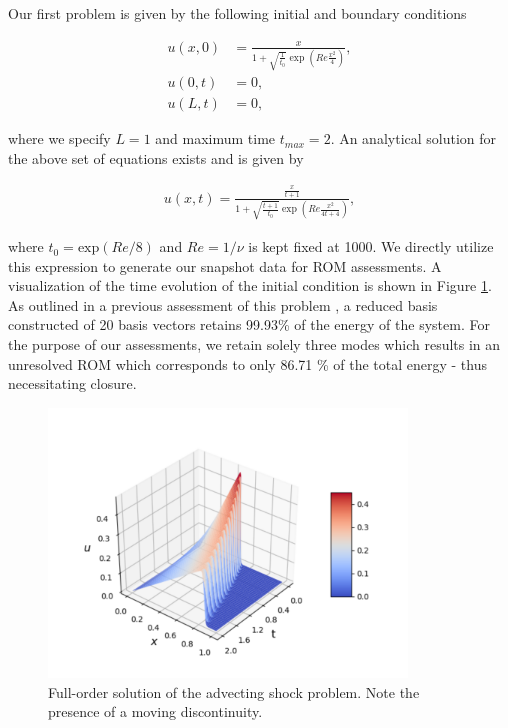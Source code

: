\documentclass[preprint,12pt]{elsarticle}
\begin{document}
Our first problem is given by the following initial and boundary conditions
\begin{linenomath*}
\begin{align}
u(x, 0) &=\frac{x}{1+\sqrt{\frac{1}{t_{0}}} \exp \left(R e \frac{x^{2}}{4}\right)}, \\ 
u(0, t) &=0, \\ 
u(L, t) &=0,
\end{align}
\end{linenomath*}
where we specify $L=1$ and maximum time $t_{max}=2$. An analytical solution for the above set of equations exists and is given by
\begin{linenomath*}
\begin{align}
u(x, t)=\frac{\frac{x}{t+1}}{1+\sqrt{\frac{t+1}{t_{0}}} \exp \left(R e \frac{x^{2}}{4 t+4}\right)},
\end{align}
\end{linenomath*}
where $t_0=\text{exp}(Re/8)$ and $Re = 1/\nu$ is kept fixed at 1000. We directly utilize this expression to generate our snapshot data for ROM assessments. A visualization of the time evolution of the initial condition is shown in Figure \ref{Figure1}. As outlined in a previous assessment of this problem \cite{san2018neural}, a reduced basis constructed of 20 basis vectors retains 99.93\% of the energy of the system. For the purpose of our assessments, we retain solely three modes which results in an unresolved ROM which corresponds to only 86.71 \% of the total energy - thus necessitating closure. 

\begin{figure}
	\centering
	\includegraphics[width=0.85\textwidth]{Figure_1.pdf}
	\caption{Full-order solution of the advecting shock problem. Note the presence of a moving discontinuity.}
	\label{Figure1}
\end{figure}
\end{document}
